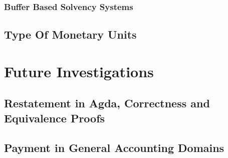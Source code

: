 \subsection{Buffer Based Solvency Systems}

\section{Type Of Monetary Units}

\chapter{Future Investigations}

\section{Restatement in Agda, Correctness and Equivalence Proofs}

\section{Payment in General Accounting Domains}

\newpage
\printbibliography{}


